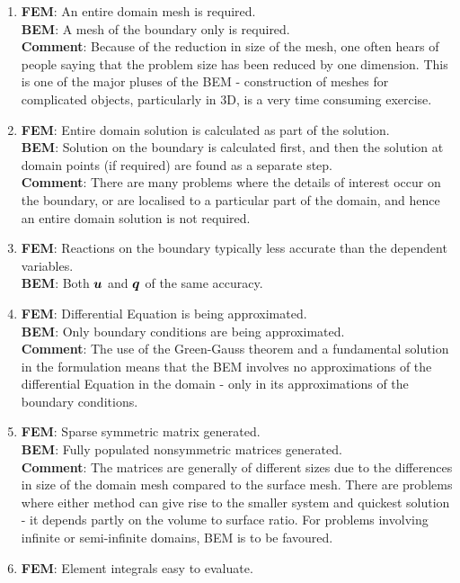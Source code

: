 \begin{enumerate}
\item \textbf{FEM}: An entire domain mesh is required. \\ 
  \textbf{BEM}: A mesh of the boundary only is required. \\ 
  \textbf{Comment}: Because of the reduction in size of the mesh, one 
  often hears of people saying that the problem size has been reduced by one
  dimension.  This is one of the major pluses of the BEM - construction of
  meshes for complicated objects, particularly in 3D, is a very time consuming
  exercise. 
\item \textbf{FEM}: Entire domain solution is calculated as part of the 
  solution. \\
  \textbf{BEM}: Solution on the boundary is calculated first, and then the 
  solution at domain points (if required) are found as a separate step. \\ 
  \textbf{Comment}: There are many problems where the details of interest occur 
  on the boundary, or are localised to a particular part of the domain, and 
  hence an entire domain solution is not required.
\item \textbf{FEM}: Reactions on the boundary typically less accurate than the 
  dependent variables. \\
  \textbf{BEM}: Both $\boldsymbol{u}$ and $\boldsymbol{q}$ of the same accuracy.
\item \textbf{FEM}: Differential Equation is being approximated. \\
  \textbf{BEM}: Only boundary conditions are being approximated. \\ 
  \textbf{Comment}: The use of the Green-Gauss theorem and a fundamental 
  solution in the formulation means that the BEM involves no approximations 
  of the differential Equation in the domain - only in its approximations 
  of the boundary conditions.
\item \textbf{FEM}: Sparse symmetric matrix generated. \\
  \textbf{BEM}: Fully populated nonsymmetric matrices generated. \\
  \textbf{Comment}: The matrices are generally of different sizes due to the 
  differences in size of the domain mesh compared to the surface mesh.  There 
  are problems where either method can give rise to the smaller system and 
  quickest solution - it depends partly on the volume to surface ratio.  
  For problems involving infinite or semi-infinite domains, BEM is to be 
  favoured.
\item \textbf{FEM}: Element integrals easy to evaluate. \\

\end{enumerate}
